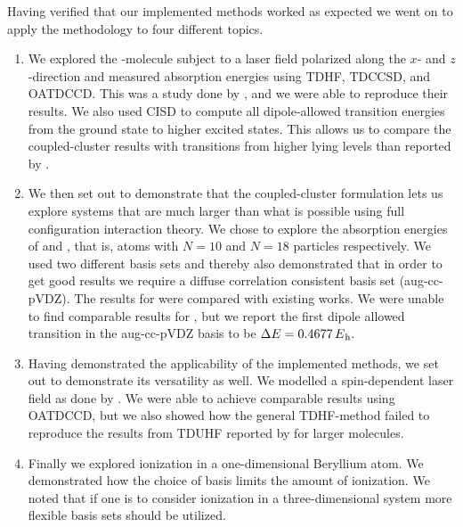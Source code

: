     Having verified that our implemented methods worked as expected we went on
    to apply the methodology to four different topics.
    \begin{enumerate}
        \item We explored the -molecule subject to a laser field
            polarized along the $x$- and $z$-direction and measured absorption
            energies using TDHF, TDCCSD, and OATDCCD.
            This was a study done by \citeauthor{nest} \cite{nest}, and we were
            able to reproduce their results.
            We also used CISD to compute all dipole-allowed transition energies
            from the ground state to higher excited states.
            This allows us to compare the coupled-cluster results with
            transitions from higher lying levels than reported by
            \citeauthor{nest} \cite{nest}.
        \item We then set out to demonstrate that the coupled-cluster
            formulation lets us explore systems that are much larger than what
            is possible using full configuration interaction theory.
            We chose to explore the absorption energies of  and ,
            that is, atoms with $N = 10$ and $N = 18$ particles respectively.
            We used two different basis sets and thereby also demonstrated that
            in order to get good results we require a diffuse correlation
            consistent basis set (aug-cc-pVDZ).
            The results for  were compared with existing works.
            We were unable to find comparable results for , but we report
            the first dipole allowed transition in the aug-cc-pVDZ basis to be
            $\Delta\energy = \SI{0.4677}{\hartree}$.
        \item Having demonstrated the applicability of the implemented methods,
            we set out to demonstrate its versatility as well.
            We modelled a spin-dependent laser field as done by
            \citeauthor{isborn} \cite{isborn}.
            We were able to achieve comparable results using OATDCCD, but we
            also showed how the general TDHF-method failed to reproduce the
            results from TDUHF reported by \citeauthor{isborn} \cite{isborn} for
            larger molecules.
        \item Finally we explored ionization in a one-dimensional Beryllium
            atom.
            We demonstrated how the choice of basis limits the amount of
            ionization.
            We noted that if one is to consider ionization in a
            three-dimensional system more flexible basis sets should be
            utilized.
    \end{enumerate}
